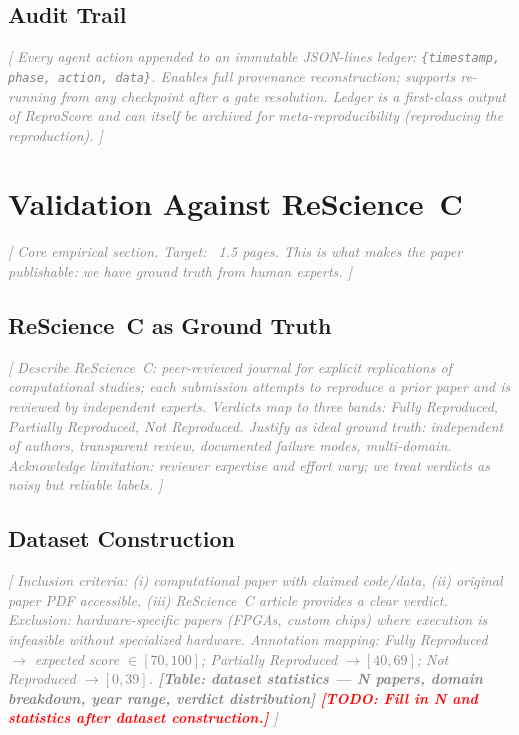 \documentclass{article}
\newcommand{\outline}[1]{\textcolor{gray}{\textit{[#1]}}}
\newcommand{\todo}[1]{\textcolor{red}{\textbf{[TODO: #1]}}}
\begin{document}
\subsection{Audit Trail}
\label{sec:ledger}

\outline{%
  Every agent action appended to an immutable JSON-lines ledger:
  \texttt{\{timestamp, phase, action, data\}}.
  Enables full provenance reconstruction; supports re-running from any
  checkpoint after a gate resolution.
  Ledger is a first-class output of ReproScore and can itself be archived
  for meta-reproducibility (reproducing the reproduction).
}

\section{Validation Against ReScience~C}
\label{sec:validation}

\outline{%
  Core empirical section. Target: ~1.5 pages. This is what makes the
  paper publishable: we have ground truth from human experts.
}

\subsection{ReScience~C as Ground Truth}
\label{sec:rescience}

\outline{%
  Describe ReScience~C: peer-reviewed journal for explicit replications of
  computational studies; each submission attempts to reproduce a prior
  paper and is reviewed by independent experts.
  Verdicts map to three bands: Fully Reproduced, Partially Reproduced,
  Not Reproduced.
  Justify as ideal ground truth: independent of authors, transparent
  review, documented failure modes, multi-domain.
  Acknowledge limitation: reviewer expertise and effort vary; we treat
  verdicts as noisy but reliable labels.
}

\subsection{Dataset Construction}
\label{sec:dataset}

\outline{%
  Inclusion criteria: (i) computational paper with claimed code/data,
  (ii) original paper PDF accessible, (iii) ReScience~C article provides
  a clear verdict.
  Exclusion: hardware-specific papers (FPGAs, custom chips) where
  execution is infeasible without specialized hardware.
  Annotation mapping: Fully Reproduced $\to$ expected score $\in [70, 100]$;
  Partially Reproduced $\to [40, 69]$; Not Reproduced $\to [0, 39]$.
  \textbf{[Table: dataset statistics — N papers, domain breakdown, year range,
  verdict distribution]}
  \todo{Fill in N and statistics after dataset construction.}
}
\end{document}
